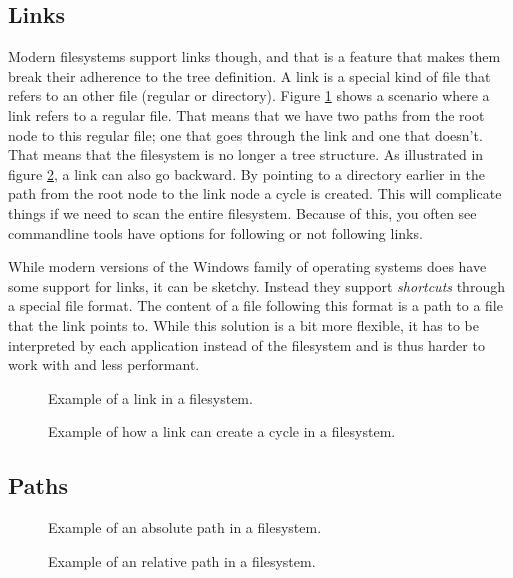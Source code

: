 \subsection{Links}

Modern filesystems support links though, and that is a feature that makes them break their adherence to the tree definition. A link is a special kind of file that refers to an other file (regular or directory). Figure \ref{fig:bs:fs:links} shows a scenario where a link refers to a regular file. That means that we have two paths from the root node to this regular file; one that goes through the link and one that doesn't. That means that the filesystem is no longer a tree structure. As illustrated in figure \ref{fig:bs:fs:cycles}, a link can also go backward. By pointing to a directory earlier in the path from the root node to the link node a cycle is created. This will complicate things if we need to scan the entire filesystem. Because of this, you often see commandline tools have options for following or not following links.

While modern versions of the Windows family of operating systems does have some support for links, it can be sketchy. Instead they support \textsl{shortcuts} through a special  file format. The content of a file following this format is a path to a file that the link points to. While this solution is a bit more flexible, it has to be interpreted by each application instead of the filesystem and is thus harder to work with and less performant.

\begin{figure}[tbp]
  
  \caption{Example of a link in a filesystem.}
  \label{fig:bs:fs:links}
\end{figure}

\begin{figure}[tbp]
  
  \caption{Example of how a link can create a cycle in a filesystem.}
  \label{fig:bs:fs:cycles}
\end{figure}

\subsection{Paths}

\begin{figure}[tbp]
  
  \caption{Example of an absolute path in a filesystem.}
  \label{fig:bs:fs:path:abs}
\end{figure}

\begin{figure}[tbp]
  
  \caption{Example of an relative path in a filesystem.}
  \label{fig:bs:fs:path:rel}
\end{figure}

